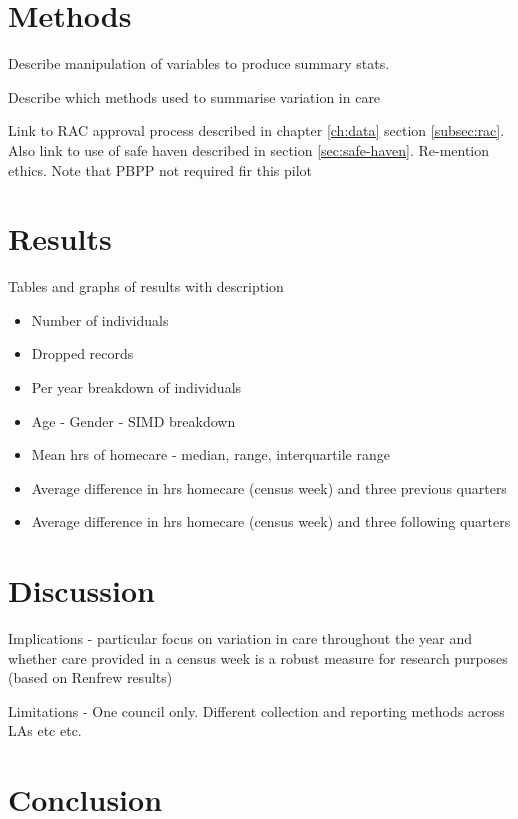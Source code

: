 \documentclass[12pt,]{report}
\begin{document}
\section{Methods}\label{sec:renf-methods}

Describe manipulation of variables to produce summary stats.

Describe which methods used to summarise variation in care

Link to RAC approval process described in chapter \ref{ch:data} section
\ref{subsec:rac}. Also link to use of safe haven described in section
\ref{sec:safe-haven}. Re-mention ethics. Note that PBPP not required fir
this pilot

\section{Results}\label{sec:renf-results}

Tables and graphs of results with description

\begin{itemize}[noitemsep]
\item Number of individuals
\item Dropped records
\item Per year breakdown of individuals
\item Age - Gender - SIMD breakdown
\item Mean hrs of homecare - median, range, interquartile range
\item Average difference in hrs homecare (census week) and three previous quarters
\item Average difference in hrs homecare (census week) and three following quarters
\end{itemize}

\section{Discussion}\label{sec:renf-discuss}

Implications - particular focus on variation in care throughout the year
and whether care provided in a census week is a robust measure for
research purposes (based on Renfrew results)

Limitations - One council only. Different collection and reporting
methods across LAs etc etc.

\section{Conclusion}\label{sec:renf-conc}
\end{document}
